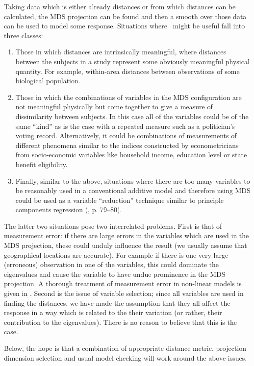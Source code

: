 Taking data which is either already distances or from which distances can be calculated, the MDS projection can be found and then a smooth over those data can be used to model some response. Situations where \mdsds\ might be useful fall into three classes: 
\begin{enumerate}
\item Those in which distances are intrinsically meaningful, where distances between the subjects in a study represent some obviously meaningful physical quantity. For example, within-area distances  between observations of some biological population.
\item Those in which the combinations of variables in the MDS configuration are not meaningful physically but come together to give a measure of dissimilarity between subjects. In this case all of the variables could be of the same ``kind'' as is the case with a repeated measure such as a politician's voting record. Alternatively, it could be combinations of measurements of different phenomena similar to the indices constructed by econometricians from socio-economic variables like household income, education level or state benefit eligibility.
\item Finally, similar to the above, situations where there are too many variables to be reasonably used in a conventional additive model and therefore using MDS could be used as a variable ``reduction'' technique similar to principle components regression (\cite{elements}, p. 79--80).
\end{enumerate}
The latter two situations pose two interrelated problems. First is that of measurement error: if there are large errors in the variables which are used in the MDS projection, these could unduly influence the result (we usually assume that geographical locations are accurate). For example if there is one very large (erroneous) observation in one of the variables, this could dominate the eigenvalues and cause the variable to have undue prominence in the MDS projection. A thorough treatment of measurement error in non-linear models is given in . Second is the issue of variable selection; since all variables are used in finding the distances, we have made the assumption that they all affect the response in a way which is related to the their variation (or rather, their contribution to the eigenvalues). There is no reason to believe that this is the case.

Below, the hope is that a combination of appropriate distance metric, projection dimension selection and usual model checking will work around the above issues.

